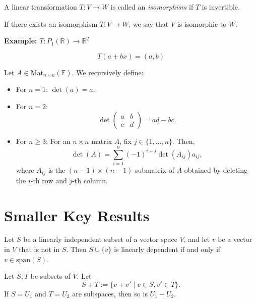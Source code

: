 \documentclass{article}
\newcommand{\secbreak}{\noindent \hrulefill \vspace{1cm}}
\begin{document}
\begin{definition}
A linear transformation \( T: V \to W \) is called an \emph{isomorphism} if \( T \) is invertible.

If there exists an isomorphism \( T: V \to W \), we say that \( V \) is isomorphic to \( W \).
\end{definition}

\textbf{Example:} \( T: P_1(\mathbb{R}) \to \mathbb{R}^2 \)

\[
T(a + bx) = (a, b)
\]


\begin{definition}[Determinant]
Let \( A \in \mathrm{Mat}_{n \times n}(\mathbb{F}) \). We recursively define:
\begin{itemize}
    \item For \( n = 1 \): \(\det(a) = a\).
    \item For \( n = 2 \):
    \[
    \det\begin{pmatrix}
    a & b \\
    c & d
    \end{pmatrix} = ad - bc.
    \]
    \item For \( n \geq 3 \): For an \( n \times n \) matrix \( A \), fix \( j \in \{1, \ldots, n\} \). Then,
    \[
    \det(A) = \sum_{i=1}^{n} (-1)^{i+j} \det(A_{ij}) a_{ij},
    \]
    where \( A_{ij} \) is the \((n-1) \times (n-1)\) submatrix of \( A \) obtained by deleting the \( i \)-th row and \( j \)-th column.
\end{itemize}
\end{definition}


\secbreak


\section*{Smaller Key Results}

\begin{definition}
    Let \( S \) be a linearly independent subset of a vector space \( V \), and let \( v \) be a vector in \( V \) that is not in \( S \). Then \( S \cup \{v\} \) is linearly dependent if and only if \( v \in \text{span}(S) \).
\end{definition}

\begin{definition}
    Let \( S, T \) be subsets of \( V \). Let
    \[
    S + T := \{ v + v' \mid v \in S, v' \in T \}.
    \]
    If \( S = U_1 \) and \( T = U_2 \) are subspaces, then so is \( U_1 + U_2 \).
\end{definition}
\end{document}
